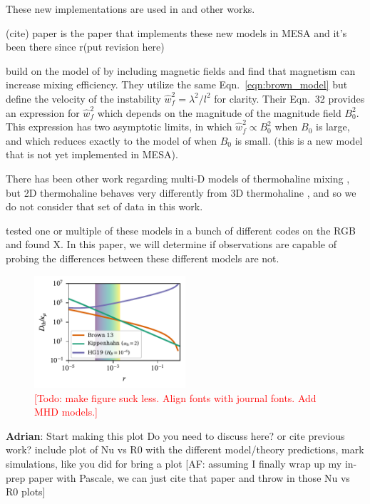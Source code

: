 These new implementations are used in \citep{bauer_bildsten_2019} and other works.

(cite) paper is the paper that implements these new models in MESA and it's been there since r(put revision here)


\citet{harrington} build on the model of \citet{brown_etal_2013} by including magnetic fields and find that magnetism can increase mixing efficiency.
They utilize the same Eqn.~\ref{eqn:brown_model} but define the velocity of the instability $\hat{w}_f^2 = \lambda^2/l^2$ for clarity. 
Their Eqn.~32 provides an expression for $\hat{w}_f^2$ which depends on the magnitude of the magnitude field $B_0^2$.
This expression has two asymptotic limits, in which $\hat{w}_f^2 \propto B_0^2$ when $B_0$ is large, and which reduces exactly to the model of \citet{brown_etal_2013} when $B_0$ is small.
(this is a new model that is not yet implemented in MESA).


There has been other work regarding multi-D models of thermohaline mixing \citep{denissenkov_2010, denissenkov_merryfield_2011}, but 2D thermohaline behaves very differently from 3D thermohaline \citep{garaud_brummell_2015}, and so we do not consider that set of data in this work.

\citet{lattanzio_etal_2015} tested one or multiple of these models in a bunch of different codes on the RGB and found X.
In this paper, we will determine if observations are capable of probing the differences between these different models are not.

\begin{figure}
    \centering
    \includegraphics[width=0.5\textwidth]{Nu_models_comparison.pdf}
    \caption{\textcolor{red}{[Todo: make figure suck less. Align fonts with journal fonts. Add MHD models.]}}
    \label{fig:parameterization_compare}
\end{figure}

\textbf{Adrian}: Start making this plot
Do you need to discuss here? or cite previous work? include plot of Nu vs R0 with the different model/theory predictions, mark simulations, like you did for bring a plot [AF: assuming I finally wrap up my in-prep paper with Pascale, we can just cite that paper and throw in those Nu vs R0 plots]
